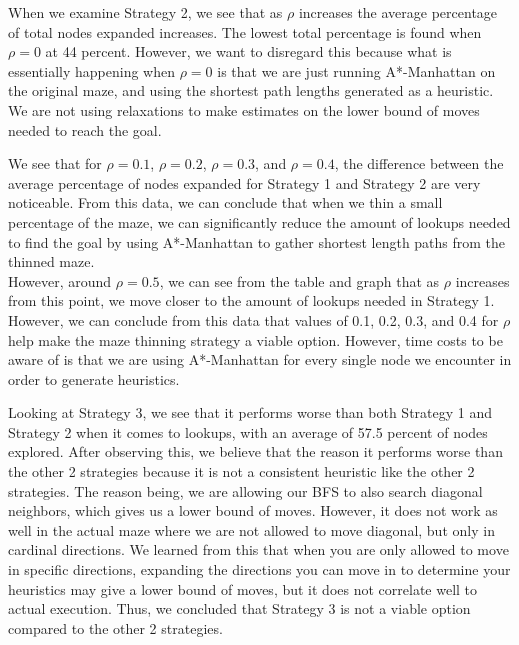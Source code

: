 \documentclass[11pt]{scrartcl} %
\begin{document}
\vspace{1em}

When we examine Strategy 2, we see that as $\rho$ increases the average percentage of total nodes expanded increases. The lowest total percentage is found when $\rho = 0$ at 44 percent. However, we want to disregard this because what is essentially happening when $\rho = 0$ is that we are just running A*-Manhattan on the original maze, and using the shortest path lengths generated as a heuristic. We are not using relaxations to make estimates on the lower bound of moves needed to reach the goal.

\vspace{1em}

We see that for $\rho = 0.1$, $\rho = 0.2$, $\rho = 0.3$, and $\rho = 0.4$, the difference between the average percentage of nodes expanded for Strategy 1 and Strategy 2 are very noticeable. From this data, we can conclude that when we thin a small percentage of the maze, we can significantly reduce the amount of lookups needed to find the goal by using A*-Manhattan to gather shortest length paths from the thinned maze.\vspace{2em} \\
However, around $\rho = 0.5$, we can see from the table and graph that as $\rho$ increases from this point, we move closer to the amount of lookups needed in Strategy 1. However, we can conclude from this data that values of 0.1, 0.2, 0.3, and 0.4 for $\rho$ help make the maze thinning strategy a viable option. However, time costs to be aware of is that we are using A*-Manhattan for every single node we encounter in order to generate heuristics.

\vspace{1em}

Looking at Strategy 3, we see that it performs worse than both Strategy 1 and Strategy 2 when it comes to lookups, with an average of 57.5 percent of nodes explored. After observing this, we believe that the reason it performs worse than the other 2 strategies because it is not a consistent heuristic like the other 2 strategies. The reason being, we are allowing our BFS to also search diagonal neighbors, which gives us a lower bound of moves. However, it does not work as well in the actual maze where we are not allowed to move diagonal, but only in cardinal directions. We learned from this that when you are only allowed to move in specific directions, expanding the directions you can move in to determine your heuristics may give a lower bound of moves, but it does not correlate well to actual execution. Thus, we concluded that Strategy 3 is not a viable option compared to the other 2 strategies.
\end{document}
